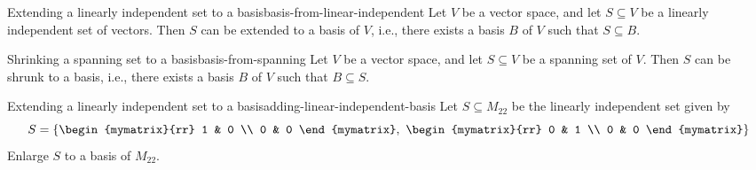 \begin{proposition}{Extending a linearly independent set to a basis}{basis-from-linear-independent}
  Let $V$ be a vector space, and let $S\subseteq V$ be a linearly
  independent set of vectors. Then $S$ can be extended to a basis of
  $V$, i.e., there exists a basis $B$ of $V$ such that $S\subseteq
  B$.%
\end{proposition}

\begin{proposition}{Shrinking a spanning set to a basis}{basis-from-spanning}
  Let $V$ be a vector space, and let $S\subseteq V$ be a spanning set
  of $V$. Then $S$ can be shrunk to a basis, i.e., there exists a
  basis $B$ of $V$ such that $B\subseteq S$.
\end{proposition}

\begin{example}{Extending a linearly independent set to a basis}{adding-linear-independent-basis}
  Let $S \subseteq M_{22}$ be the linearly independent set given by
  \begin{equation*}
    S  = \set{
      \begin{mymatrix}{rr}
        1 & 0 \\
        0 & 0
      \end{mymatrix},~
      \begin{mymatrix}{rr}
        0 & 1 \\
        0 & 0
      \end{mymatrix}
    }
  \end{equation*}
  Enlarge $S$ to a basis of $M_{22}$.
\end{example}

